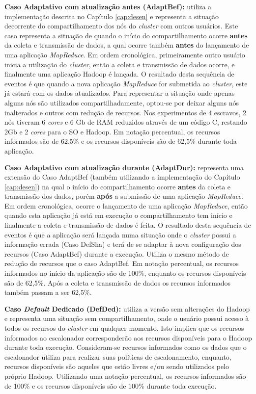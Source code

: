 \textbf{Caso Adaptativo com atualização antes (AdaptBef):} utiliza a implementação descrita no Capítulo \ref{cap:desen} e representa a situação decorrente do compartilhamento dos nós do \textit{cluster} com outros usuários. Este caso representa a situação de quando o início do compartilhamento ocorre \textbf{antes} da coleta e transmissão de dados, a qual ocorre também \textbf{antes} do lançamento de uma aplicação \textit{MapReduce}. Em ordem cronológica, primeiramente outro usuário inicia a utilização do \textit{cluster}, então a coleta e transmissão de dados ocorre, e finalmente uma aplicação Hadoop é lançada. O resultado desta sequência de eventos é que quando a nova aplicação \textit{MapReduce} for submetida ao \textit{cluster}, este já estará com os dados atualizados. Para representar a situação onde apenas alguns nós são utilizados compartilhadamente, optou-se por deixar alguns nós inalterados e outros com redução de recursos. Nos experimentos de 4 escravos, 2 nós tiveram 6 \textit{cores} e 6 Gb de RAM reduzidos através de um código C, restando 2Gb e 2 \textit{cores} para o SO e Hadoop. Em notação percentual, os recursos informados são de 62,5\% e os recursos disponíveis são de 62,5\% durante toda aplicação.

\textbf{Caso Adaptativo com atualização durante (AdaptDur):} representa uma extensão do Caso AdaptBef (também utilizando a implementação do Capítulo \ref{cap:desen}) na qual o início do compartilhamento ocorre \textbf{antes} da coleta e transmissão dos dados, porém \textbf{após} a submissão de uma aplicação \textit{MapReduce}. Em ordem cronológica, ocorre o lançamento de uma aplicação \textit{MapReduce}, então quando esta aplicação já está em execução o compartilhamento tem início e finalmente a coleta e transmissão de dados é feita. O resultado desta sequência de eventos é que a aplicação será lançada numa situação onde o \textit{cluster} possui a informação errada (Caso DefSha) e terá de se adaptar à nova configuração dos recursos (Caso AdaptBef) durante a execução. Utiliza o mesmo método de redução de recursos que o caso AdaptBef. Em notação percentual, os recursos informados no início da aplicação são de 100\%, enquanto os recursos disponíveis são de 62,5\%. Após a coleta e transmissão de dados os recursos informados também passam a ser 62,5\%.

\textbf{Caso \textit{Default} Dedicado (DefDed):} utiliza a versão sem alterações do Hadoop e representa uma situação sem compartilhamento, onde o usuário possui acesso à todos os recursos do \textit{cluster} em qualquer momento. Isto implica que os recursos informados ao escalonador corresponderão aos recursos disponíveis para o Hadoop durante toda execução. Consideram-se recursos informados como os dados que o escalonador utiliza para realizar suas políticas de escalonamento, enquanto, recursos disponíveis são aqueles que estão livres e/ou sendo utilizados pelo próprio Hadoop. Utilizando uma notação percentual, os recursos informados são de 100\% e os recursos disponíveis são de 100\% durante toda execução.

